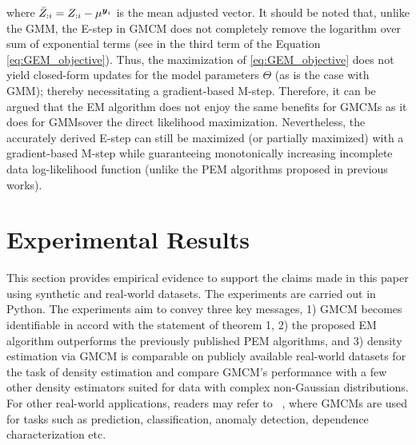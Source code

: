 \documentclass{article}
\begin{document}
where $\bar{Z}_{:{i}}=Z_{:i}-\mu^{\boldsymbol{y}_i}$ is the mean adjusted vector. It should be noted that, unlike the GMM, the E-step in GMCM does not completely remove the logarithm over sum of exponential terms (see in the third term of the Equation \ref{eq:GEM_objective}). Thus, the maximization of \eqref{eq:GEM_objective} does not yield closed-form updates for the model parameters $\Theta$ (as is the case with GMM); thereby necessitating a gradient-based M-step. Therefore, it can be argued that the EM algorithm does not enjoy the same benefits for GMCMs \textemdash as it does for GMMs\textemdash over the direct likelihood maximization. Nevertheless, the accurately derived E-step can still be maximized (or partially maximized) with a gradient-based M-step while guaranteeing monotonically increasing incomplete data log-likelihood function (unlike the PEM algorithms proposed in previous works).

\section{Experimental Results}\label{sec:Experimental}
This section provides empirical evidence to support the claims made in this paper using synthetic and real-world datasets. The experiments are carried out in Python.  The experiments aim to convey three key messages, 1) GMCM becomes identifiable in accord with the statement of theorem 1, 2) the proposed EM algorithm outperforms the previously published  PEM algorithms, and 3) density estimation via GMCM is comparable on  publicly available real-world datasets for the task of density estimation and compare GMCM's performance with a few other density estimators suited for data with complex non-Gaussian distributions. For other real-world applications, readers may refer to ~\cite{Bilgrau2012quantification,Wang2014,Yu2013GMCMWindPred,Bayestehtashk2015}, where GMCMs are used for tasks such as prediction, classification, anomaly detection, dependence characterization etc.
\end{document}
